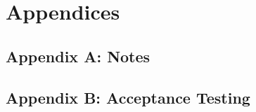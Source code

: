 \documentclass[12pt]{article}
\begin{document}
\section{Appendices}


\subsection*{Appendix A: Notes}

\subsection*{Appendix B: Acceptance Testing}
\end{document}
